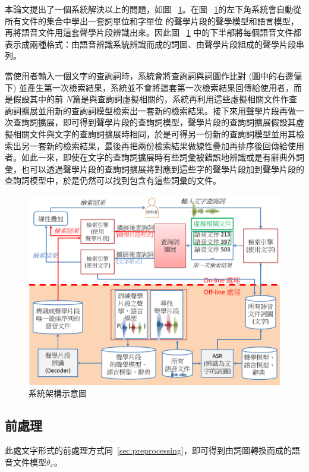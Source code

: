 本論文提出了一個系統解決以上的問題，如圖 ~\ref{fig:chap3_system}。在圖 ~\ref{fig:chap3_system}的左下角系統會自動從所有文件的集合中學出一套詞單位和字單位 的聲學片段的聲學模型和語言模型，再將語音文件用這套聲學片段辨識出來。因此圖 ~\ref{fig:chap3_system} 中的下半部將每個語音文件都表示成兩種格式：由語音辨識系統辨識而成的詞圖、由聲學片段組成的聲學片段串列。

當使用者輸入一個文字的查詢詞時，系統會將查詢詞與詞圖作比對 (圖中的右邊偏下) 並產生第一次檢索結果，系統並不會將這套第一次檢索結果回傳給使用者，而是假設其中的前
$N$篇是與查詢詞虛擬相關的，系統再利用這些虛擬相關文件作查詢詞擴展並用新的查詢詞模型檢索出一套新的檢索結果。接下來用聲學片段再做一次查詢詞擴展，即可得到聲學片段的查詢詞模型，聲學片段的查詢詞擴展假設其虛擬相關文件與文字的查詢詞擴展時相同，於是可得另一份新的查詢詞模型並用其檢索出另一套新的檢索結果，最後再把兩份檢索結果做線性疊加再排序後回傳給使用者。如此一來，即使在文字的查詢詞擴展時有些詞彙被錯誤地辨識或是有辭典外詞彙，也可以透過聲學片段的查詢詞擴展將對應到這些字的聲學片段加到聲學片段的查詢詞模型中，於是仍然可以找到包含有這些詞彙的文件。

\begin{figure}
\centering
\includegraphics[scale=0.5]{images/chap3_system_zh.png}
\caption{系統架構示意圖} \label{fig:chap3_system}
\end{figure}

\subsection{前處理}
此處文字形式的前處理方式同~\ref{sec:preprocessing}，即可得到由詞圖轉換而成的語音文件模型$\bar{\theta}_x$。

